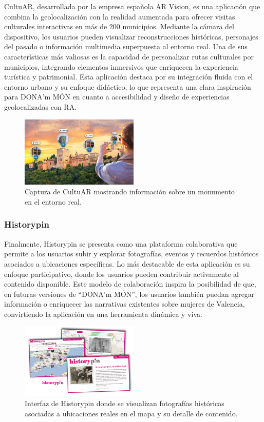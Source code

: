 CultuAR, desarrollada por la empresa española AR Vision, es una aplicación que combina la geolocalización con la realidad aumentada para ofrecer visitas culturales interactivas en más de 200 municipios. Mediante la cámara del dispositivo, los usuarios pueden visualizar reconstrucciones históricas, personajes del pasado o información multimedia superpuesta al entorno real. Una de sus características más valiosas es la capacidad de personalizar rutas culturales por municipios, integrando elementos inmersivos que enriquecen la experiencia turística y patrimonial. Esta aplicación destaca por su integración fluida con el entorno urbano y su enfoque didáctico, lo que representa una clara inspiración para DONA'm MÓN en cuanto a accesibilidad y diseño de experiencias geolocalizadas con RA.

\begin{figure}[H]
    \centering
    \includegraphics[width=0.5\textwidth]{figs/cultuar.jpeg}
    \caption{Captura de CultuAR mostrando información sobre un monumento en el entorno real.}
    \label{fig:cultuar}
\end{figure}

\subsubsection{Historypin}

Finalmente, Historypin se presenta como una plataforma colaborativa que permite a los usuarios subir y explorar fotografías, eventos y recuerdos históricos asociados a ubicaciones específicas. Lo más destacable de esta aplicación es su enfoque participativo, donde los usuarios pueden contribuir activamente al contenido disponible. Este modelo de colaboración inspira la posibilidad de que, en futuras versiones de “DONA’m MÓN”, los usuarios también puedan agregar información o enriquecer las narrativas existentes sobre mujeres de Valencia, convirtiendo la aplicación en una herramienta dinámica y viva.

\begin{figure}[H]
    \centering
    \includegraphics[width=0.5\textwidth]{figs/history-pin.png}
    \caption{Interfaz de Historypin donde se visualizan fotografías históricas asociadas a ubicaciones reales en el mapa y su detalle de contenido.}
    \label{fig:historypin}
\end{figure}

